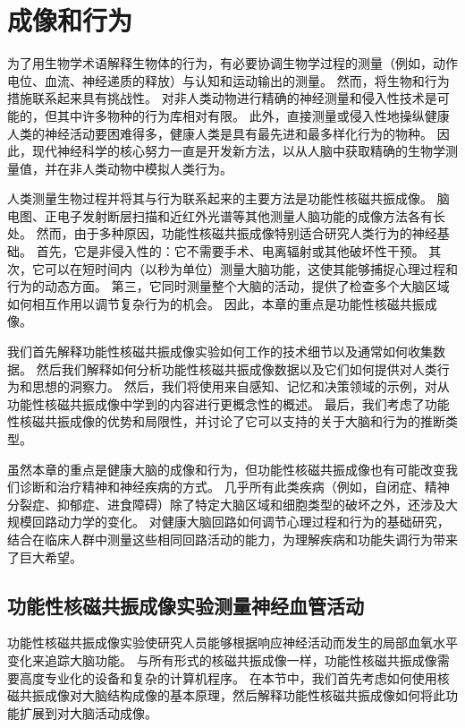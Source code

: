 \chapter{成像和行为} \label{chap:chap6}

为了用生物学术语解释生物体的行为，有必要协调生物学过程的测量（例如，动作电位、血流、神经递质的释放）与认知和运动输出的测量。
然而，将生物和行为措施联系起来具有挑战性。
对非人类动物进行精确的神经测量和侵入性技术是可能的，但其中许多物种的行为库相对有限。
此外，直接测量或侵入性地操纵健康人类的神经活动要困难得多，健康人类是具有最先进和最多样化行为的物种。 
因此，现代神经科学的核心努力一直是开发新方法，以从人脑中获取精确的生物学测量值，并在非人类动物中模拟人类行为。


人类测量生物过程并将其与行为联系起来的主要方法是功能性核磁共振成像。
脑电图、正电子发射断层扫描和近红外光谱等其他测量人脑功能的成像方法各有长处。
然而，由于多种原因，功能性核磁共振成像特别适合研究人类行为的神经基础。
首先，它是非侵入性的：它不需要手术、电离辐射或其他破坏性干预。
其次，它可以在短时间内（以秒为单位）测量大脑功能，这使其能够捕捉心理过程和行为的动态方面。
第三，它同时测量整个大脑的活动，提供了检查多个大脑区域如何相互作用以调节复杂行为的机会。
因此，本章的重点是功能性核磁共振成像。


我们首先解释功能性核磁共振成像实验如何工作的技术细节以及通常如何收集数据。 
然后我们解释如何分析功能性核磁共振成像数据以及它们如何提供对人类行为和思想的洞察力。 
然后，我们将使用来自感知、记忆和决策领域的示例，对从功能性核磁共振成像中学到的内容进行更概念性的概述。
最后，我们考虑了功能性核磁共振成像的优势和局限性，并讨论了它可以支持的关于大脑和行为的推断类型。


虽然本章的重点是健康大脑的成像和行为，但功能性核磁共振成像也有可能改变我们诊断和治疗精神和神经疾病的方式。 
几乎所有此类疾病（例如，自闭症、精神分裂症、抑郁症、进食障碍）除了特定大脑区域和细胞类型的破坏之外，还涉及大规模回路动力学的变化。 
对健康大脑回路如何调节心理过程和行为的基础研究，结合在临床人群中测量这些相同回路活动的能力，为理解疾病和功能失调行为带来了巨大希望。



\section{功能性核磁共振成像实验测量神经血管活动}

功能性核磁共振成像实验使研究人员能够根据响应神经活动而发生的局部血氧水平变化来追踪大脑功能。
与所有形式的核磁共振成像一样，功能性核磁共振成像需要高度专业化的设备和复杂的计算机程序。 
在本节中，我们首先考虑如何使用核磁共振成像对大脑结构成像的基本原理，然后解释功能性核磁共振成像如何将此功能扩展到对大脑活动成像。


